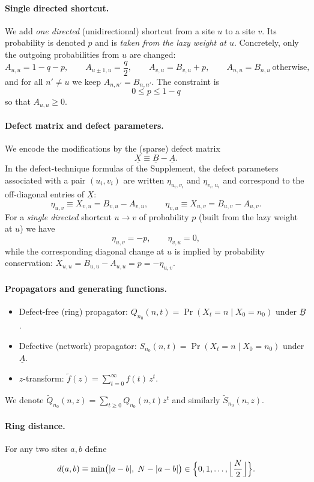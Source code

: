 \documentclass[11pt]{article}
\begin{document}
\paragraph{Single directed shortcut.}
We add \emph{one directed} (unidirectional) shortcut from a site $u$ to a site $v$.
Its probability is denoted $p$ and is \emph{taken from the lazy weight at $u$}. Concretely, only the
outgoing probabilities from $u$ are changed:
\[
A_{u,u}=1-q-p,\qquad A_{u\pm 1,u}=\frac q2,\qquad A_{v,u}=B_{v,u}+p,\qquad
A_{n,u}=B_{n,u}\ \text{otherwise},
\]
and for all $n'\neq u$ we keep $A_{n,n'}=B_{n,n'}$.
The constraint is
\[
0\le p\le 1-q
\]
so that $A_{u,u}\ge 0$.

\paragraph{Defect matrix and defect parameters.}
We encode the modifications by the (sparse) defect matrix
\[
\underline{X}\equiv \underline{B}-\underline{A}.
\]
In the defect-technique formulas of the Supplement, the defect parameters associated with a pair $(u_i,v_i)$ are
written $\eta_{u_i,v_i}$ and $\eta_{v_i,u_i}$ and correspond to the off-diagonal entries of $\underline{X}$:
\[
\eta_{u,v}\equiv X_{v,u}=B_{v,u}-A_{v,u},\qquad \eta_{v,u}\equiv X_{u,v}=B_{u,v}-A_{u,v}.
\]
For a \emph{single directed} shortcut $u\to v$ of probability $p$ (built from the lazy weight at $u$) we have
\[
\boxed{\eta_{u,v}=-p,\qquad \eta_{v,u}=0,}
\]
while the corresponding diagonal change at $u$ is implied by probability conservation:
$X_{u,u}=B_{u,u}-A_{u,u}=p=-\eta_{u,v}$.

\paragraph{Propagators and generating functions.}
\begin{itemize}
\item Defect-free (ring) propagator: $Q_{n_0}(n,t)=\Pr(X_t=n\mid X_0=n_0)$ under $\underline{B}$.
\item Defective (network) propagator: $S_{n_0}(n,t)=\Pr(X_t=n\mid X_0=n_0)$ under $\underline{A}$.
\item $z$-transform: $\tilde f(z)=\sum_{t=0}^\infty f(t)\,z^t$.
\end{itemize}
We denote $\tilde Q_{n_0}(n,z)=\sum_{t\ge 0} Q_{n_0}(n,t)z^t$ and similarly $\tilde S_{n_0}(n,z)$.

\paragraph{Ring distance.}
For any two sites $a,b$ define
\[
d(a,b)\equiv \min\bigl(|a-b|,\;N-|a-b|\bigr)\in\Bigl\{0,1,\dots,\Bigl\lfloor \frac N2\Bigr\rfloor\Bigr\}.
\]
\end{document}
